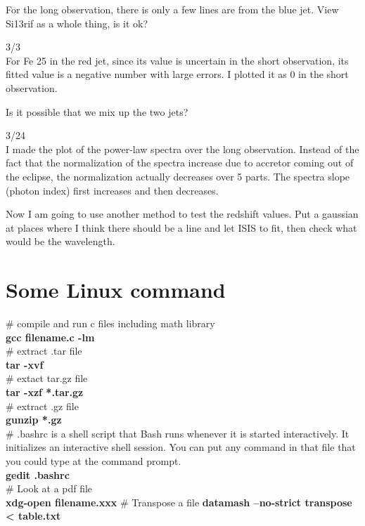 For the long observation, there is only a few lines are from the blue jet. View Si13rif as a whole thing, is it ok?

3/3\\
For Fe 25 in the red jet, since its value is uncertain in the short observation, its fitted value is a negative number with large errors. I plotted it as 0 in the short observation.\par
Is it possible that we mix up the two jets?\par

3/24\\
I made the plot of the power-law spectra over the long observation. Instead of the fact that the normalization of the spectra increase due to accretor coming out of the eclipse, the normalization actually decreases over 5 parts. The spectra slope (photon index) first increases and then decreases. \par
Now I am going to use another method to test the redshift values. Put a gaussian at places where I think there should be a line and let ISIS to fit, then check what would be the wavelength.





\clearpage{}
\section{Some Linux command}
\# compile and run c files including math library\\
\textbf{gcc filename.c -lm}\\
\# extract .tar file\\
\textbf{tar -xvf}\\
\# extact tar.gz file\\
\textbf{tar -xzf *.tar.gz}\\
\# extract .gz file\\
\textbf{gunzip *.gz}\\
\# .bashrc is a shell script that Bash runs whenever it is started interactively. It initializes an interactive shell session. You can put any command in that file that you could type at the command prompt.\\
\textbf{gedit .bashrc}\\
\# Look at a pdf file\\
\textbf{xdg-open filename.xxx}
\# Transpose a file
\textbf{datamash --no-strict transpose < table.txt}\\



